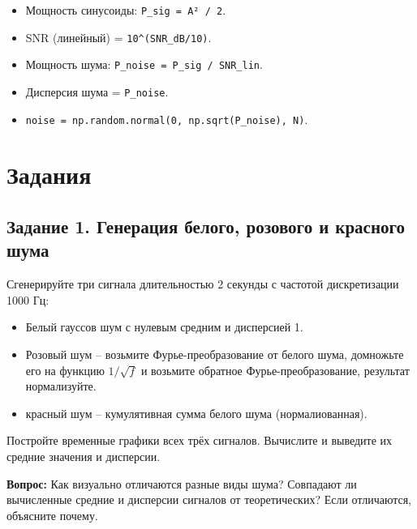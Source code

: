\documentclass[12pt,a4paper,openany]{book}
\providecommand{\tightlist}{\setlength{\itemsep}{0pt}\setlength{\parskip}{0pt}}
\begin{document}
\begin{itemize}
\tightlist
\item
  Мощность синусоиды: \texttt{P\_\allowbreak{}sig\ =\allowbreak{}\ A²\ /\allowbreak{}\ 2}.
\item
  SNR (линейный) = \texttt{10\^{}(\allowbreak{}SNR\_\allowbreak{}dB/\allowbreak{}10)}.
\item
  Мощность шума: \texttt{P\_\allowbreak{}noise\ =\allowbreak{}\ P\_\allowbreak{}sig\ /\allowbreak{}\ SNR\_\allowbreak{}lin}.
\item
  Дисперсия шума = \texttt{P\_\allowbreak{}noise}.
\item
  \texttt{noise\ =\allowbreak{}\ np.\allowbreak{}random.\allowbreak{}normal(\allowbreak{}0,\allowbreak{}\ np.\allowbreak{}sqrt(\allowbreak{}P\_\allowbreak{}noise),\allowbreak{}\ N)}.
\end{itemize}

\section*{Задания}

\subsection*{Задание 1. Генерация белого, розового и красного шума}

Сгенерируйте три сигнала длительностью 2 секунды с частотой дискретизации 1000 Гц:

\begin{itemize}
\tightlist
\item
  Белый гауссов шум с нулевым средним и дисперсией 1.
\item
  Розовый шум -- возьмите Фурье-преобразование от белого шума, домножьте его на функцию \(1/\sqrt{f}\) и возьмите обратное Фурье-преобразование, результат нормализуйте.
\item
  красный шум -- кумулятивная сумма белого шума (нормалиованная).
\end{itemize}

Постройте временные графики всех трёх сигналов. Вычислите и выведите их средние значения и дисперсии.

\textbf{Вопрос:} Как визуально отличаются разные виды шума? Совпадают ли вычисленные средние и дисперсии сигналов от теоретических? Если отличаются, объясните почему.
\end{document}
